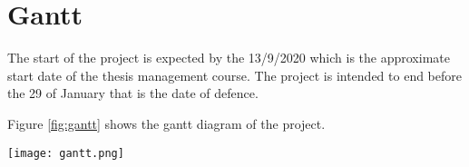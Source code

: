 \section{Gantt}

The start of the project is expected by the 13/9/2020 which is the approximate start date of the thesis management course. The project is intended to end before the 29 of January that is the date of defence.

Figure \ref{fig:gantt} shows the gantt diagram of the project.

\begin{sidewaysfigure}[htbp]
  \centering
  \texttt{[image: gantt.png]}
  \caption[Gantt diagram]{Gantt diagram. Own compilation.}
  \label{fig:gantt}
\end{sidewaysfigure}


